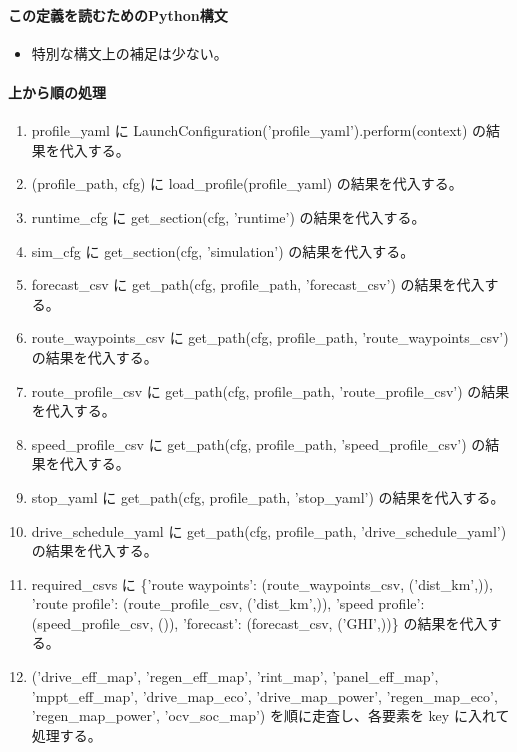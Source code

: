 \documentclass[a4paper,11pt]{article}
\begin{document}
            \paragraph{この定義を読むためのPython構文}
            \begin{itemize}[leftmargin=1.6em]
            \item 特別な構文上の補足は少ない。
            \end{itemize}
            \paragraph{上から順の処理}
            \begin{enumerate}[leftmargin=1.8em]
            \item profile\_yaml に LaunchConfiguration('profile\_yaml').perform(context) の結果を代入する。
\item (profile\_path, cfg) に load\_profile(profile\_yaml) の結果を代入する。
\item runtime\_cfg に get\_section(cfg, 'runtime') の結果を代入する。
\item sim\_cfg に get\_section(cfg, 'simulation') の結果を代入する。
\item forecast\_csv に get\_path(cfg, profile\_path, 'forecast\_csv') の結果を代入する。
\item route\_waypoints\_csv に get\_path(cfg, profile\_path, 'route\_waypoints\_csv') の結果を代入する。
\item route\_profile\_csv に get\_path(cfg, profile\_path, 'route\_profile\_csv') の結果を代入する。
\item speed\_profile\_csv に get\_path(cfg, profile\_path, 'speed\_profile\_csv') の結果を代入する。
\item stop\_yaml に get\_path(cfg, profile\_path, 'stop\_yaml') の結果を代入する。
\item drive\_schedule\_yaml に get\_path(cfg, profile\_path, 'drive\_schedule\_yaml') の結果を代入する。
\item required\_csvs に \{'route waypoints': (route\_waypoints\_csv, ('dist\_km',)), 'route profile': (route\_profile\_csv, ('dist\_km',)), 'speed profile': (speed\_profile\_csv, ()), 'forecast': (forecast\_csv, ('GHI',))\} の結果を代入する。
\item ('drive\_eff\_map', 'regen\_eff\_map', 'rint\_map', 'panel\_eff\_map', 'mppt\_eff\_map', 'drive\_map\_eco', 'drive\_map\_power', 'regen\_map\_eco', 'regen\_map\_power', 'ocv\_soc\_map') を順に走査し、各要素を key に入れて処理する。

\end{enumerate}
\end{document}
